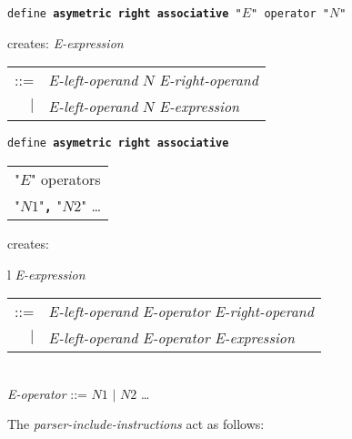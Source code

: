 \documentclass[12pt]{article}
\newcommand{\TT}[1]{{\tt \bfseries #1}}
\newenvironment{indpar}[1][0.3in]%
	{\begin{list}{}%
		     {\setlength{\itemsep}{0in}%
		      \setlength{\topsep}{0in}%
		      \setlength{\parsep}{1ex}%
		      \setlength{\labelwidth}{#1}%
		      \setlength{\leftmargin}{#1}%
		      \addtolength{\leftmargin}{\labelsep}}%
	 \item}%
	{\end{list}}
\begin{document}
\begin{indpar}
{\tt define \TT{asymetric right associative} "$E$" operator "$N$"}
\begin{indpar}
creates: {\em E-expression} \begin{tabular}[t]{rl}
                            ::= & {\em E-left-operand} $N$
			          {\em E-right-operand} \\
                            $|$ & {\em E-left-operand} $N$
			          {\em E-expression} \\
                            \end{tabular}
\end{indpar}

{\tt define \TT{asymetric right associative} \begin{tabular}[t]{l}
                                             "$E$" operators \\
					     "$N1$"\TT{,} "$N2$" \ldots \\
					     \end{tabular}}
\begin{indpar}
creates: \begin{tabular}[t]{l}
         {\em E-expression} \begin{tabular}[t]{rl}
                            ::= & {\em E-left-operand} {\em E-operator}
			          {\em E-right-operand} \\
                            $|$ & {\em E-left-operand} {\em E-operator}
			          {\em E-expression} \\
                            \end{tabular} \\
         {\em E-operator} ::= $N1$ $|$ $N2$ \ldots \\
	 \end{tabular}
\end{indpar}

\end{indpar}

The {\em parser-include-instructions} act as follows:
\end{document}
